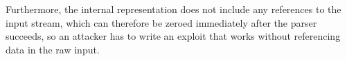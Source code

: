 Furthermore, the internal representation does not include any references to the input stream, which
can therefore be zeroed immediately after the parser succeeds, so an attacker has to write an
exploit that works without referencing data in the raw input.





